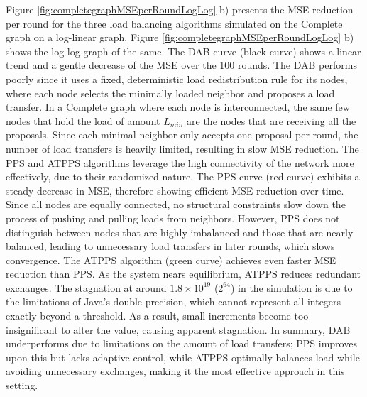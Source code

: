 Figure \ref{fig:completegraphMSEperRoundLogLog} b) presents the MSE reduction per round for the three load balancing algorithms simulated on the Complete graph on a log-linear graph. Figure \ref{fig:completegraphMSEperRoundLogLog} b) shows the log-log graph of the same. The DAB curve (black curve) shows a linear trend and a gentle decrease of the MSE over the 100 rounds. The DAB performs poorly since it uses a fixed, deterministic load redistribution rule for its nodes, where each node selects the minimally loaded neighbor and proposes a load transfer. In a Complete graph where each node is interconnected, the same few nodes that hold the load of amount $L_{min}$ are the nodes that are receiving all the proposals. Since each minimal neighbor only accepts one proposal per round, the number of load transfers is heavily limited, resulting in slow MSE reduction. The PPS and ATPPS algorithms leverage the high connectivity of the network more effectively, due to their randomized nature. The PPS curve (red curve) exhibits a steady decrease in MSE, therefore showing efficient MSE reduction over time. Since all nodes are equally connected, no structural constraints slow down the process of pushing and pulling loads from neighbors. However, PPS does not distinguish between nodes that are highly imbalanced and those that are nearly balanced, leading to unnecessary load transfers in later rounds, which slows convergence. The ATPPS algorithm (green curve) achieves even faster MSE reduction than PPS. As the system nears equilibrium, ATPPS reduces redundant exchanges. The stagnation at around $1.8\times 10^{19}$ ($2^{64}$) in the simulation is due to the limitations of Java's double precision, which cannot represent all integers exactly beyond a threshold. As a result, small increments become too insignificant to alter the value, causing apparent stagnation. In summary, DAB underperforms due to limitations on the amount of load transfers; PPS improves upon this but lacks adaptive control, while ATPPS optimally balances load while avoiding unnecessary exchanges, making it the most effective approach in this setting.

